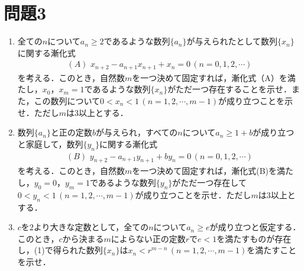 \documentclass[unicode,12pt, A4j]{ltjsarticle}%
\begin{document}
\section{問題3}
 \begin{enumerate}
  \item 全ての$n$について$a_n\ge 2$であるような数列$\{a_n\}$が与えられたとして数列$\{x_n\}$に関する漸化式
 \begin{align*}
  (A)\,\, x_{n+2}-a_{n+1}x_{n+1}+x_n=0 \, (n=0,1,2,\cdots)
 \end{align*}
 を考える．このとき，自然数$m$を一つ決めて固定すれば，漸化式（A）を満たし，$x_0$，$x_m=1$であるような数列$\{x_n\}$がただ一つ存在することを示せ．また，この数列について$0<x_n<1\, (n=1,2,\cdots,m-1)$が成り立つことを示せ．ただし$m$は$3$以上とする．
  \item 数列$\{a_n\}$と正の定数$b$が与えられ，すべての$n$について$a_n\ge 1+b$が成り立つと家庭して，数列$\{y_n\}$に関する漸化式
 \begin{align*}
  (B)\,\, y_{n+2}-a_{n+1}y_{n+1}+by_n=0 \, (n=0,1,2,\cdots)
 \end{align*}
 を考える．このとき，自然数$m$を一つ決めて固定すれば，漸化式(B)を満たし，$y_0=0$，$y_m=1$であるような数列$\{y_n\}$がただ一つ存在して$0<y_n<1\, (n=1,2,\cdots,m-1)$が成り立つことを示せ．ただし$m$は$3$以上とする．
  \item $c$を$2$より大きな定数として，全ての$n$について$a_n\ge e$が成り立つと仮定する．このとき，$c$から決まる$m$によらない正の定数$r$で$e<1$を満たすものが存在し，(1)で得られた数列$\{x_n\}$は$x_n<r^{m-n}\, (n=1,2,\cdots,m-1)$を満たすことを示せ．
 \end{enumerate}
\end{document}

